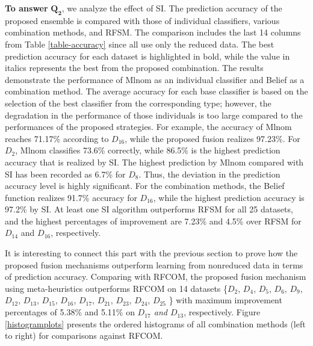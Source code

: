 \textbf{To answer} $\pmb{Q_2}$, we analyze the effect of SI. The prediction accuracy of the proposed ensemble is compared with those of individual classifiers, various combination methods, and RFSM. The comparison includes the last 14 columns from Table \ref{table-accuracy} since all use only the reduced data. The best prediction accuracy for each dataset is highlighted in bold, while the value in italics represents the best from the proposed combination. The results demonstrate the performance of Mlnom as an individual classifier and Belief as a combination method. The average accuracy for each base classifier is based on the selection of the best classifier from the corresponding type; however, the degradation in the performance of those individuals is too large compared to the performances of the proposed strategies. For example, the accuracy of Mlnom reaches 71.17\% according to \textit{$D_{16}$}, while the proposed fusion realizes 97.23\%. For \textit{$D_2$}, Mlnom classifies 73.6\% correctly, while 86.5\% is the highest prediction accuracy that is realized by SI. The highest prediction by Mlnom compared with SI has been recorded as 6.7\% for \textit{$D_8$}.  
Thus, the deviation in the prediction accuracy level is highly significant. For the combination methods, the Belief function realizes 91.7\% accuracy for \textit{$D_{16}$}, while the highest prediction accuracy is 97.2\% by SI. At least one SI algorithm outperforms RFSM for all 25 datasets, and the highest percentages of improvement are 7.23\% and 4.5\% over RFSM for \textit{$D_{14}$} and \textit{$D_{16}$}, respectively.


 
 
 It is interesting to connect this part with the previous section to prove how the proposed fusion mechanisms outperform learning from nonreduced data in terms of prediction accuracy. Comparing with RFCOM, the proposed fusion mechanism using meta-heuristics outperforms RFCOM on 14 datasets \{$D_2$, $D_4$, $D_5$, $D_6$, $D_9$, $D_{12}$, $D_{13}$, $D_{15}$, $D_{16}$, $D_{17}$, $D_{21}$, $D_{23}$, $D_{24}$, $D_{25}$
 \} with maximum improvement percentages of  5.38\% and 5.11\% on \textit{$D_{17}$ and $D_{13}$}, respectively. Figure \ref{histogramplots} presents the ordered histograms of all combination methods (left to right) for comparisons against RFCOM.    
 \vspace*{.4cm}
 

